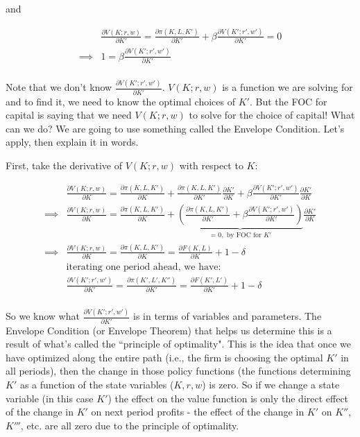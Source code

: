 \documentclass[letterpaper,12pt]{article}
\theoremstyle{definition}
\begin{document}
\begin{spacing}{1.5}
and 

\begin{equation}
\label{eqn:bellman_foc_k}
\begin{split}
&\frac{\partial V(K;r,w)}{\partial K'} = \frac{\partial \pi(K,L,K')}{\partial K'} + \beta \frac{\partial V(K'; r',w')}{\partial K'} = 0 \\
\implies & 1 = \beta \frac{\partial V(K';r',w')}{\partial K'}  \\
\end{split}
\end{equation}

Note that we don't know $\frac{\partial V(K';r',w')}{\partial K'}$.  $V(K;r,w)$ is a function we are solving for and to find it, we need to know the optimal choices of $K'$.  But the FOC for capital is saying that we need $V(K;r,w)$ to solve for the choice of capital!  What can we do?  We are going to use something called the Envelope Condition.  Let's apply, then explain it in words.

First, take the derivative of $V(K;r,w)$ with respect to $K$: 

\begin{equation}
\begin{split}
& \frac{\partial V(K;r,w)}{\partial K} = \frac{\partial \pi(K,L,K')}{\partial K} +  \frac{\partial \pi(K,L,K')}{\partial K'}\frac{\partial K'}{\partial K} + \beta  \frac{\partial V(K'; r',w')}{\partial K'}\frac{\partial K'}{\partial K} \\
\implies &  \frac{\partial V(K;r,w)}{\partial K} = \frac{\partial \pi(K,L,K')}{\partial K} +  \underbrace{\left(\frac{\partial \pi(K,L,K')}{\partial K'} + \beta  \frac{\partial V(K'; r',w')}{\partial K'}\right)}_{=0, \text{ by FOC for $K'$}}\frac{\partial K'}{\partial K} \\
\implies & \frac{\partial V(K;r,w)}{\partial K} = \frac{\partial \pi(K,L,K')}{\partial K} = \frac{\partial F(K,L)}{\partial K} + 1 - \delta \\
& \text{iterating one period ahead, we have:}\\
& \frac{\partial V(K';r',w')}{\partial K'} = \frac{\partial \pi(K',L',K'')}{\partial K'} =  \frac{\partial F(K',L')}{\partial K'} + 1 - \delta  \\
\end{split}
\end{equation}

So we know what $ \frac{\partial V(K';r',w')}{\partial K'}$ is in terms of variables and parameters.  The Envelope Condition (or Envelope Theorem) that helps us determine this is a result of what's called the ``principle of optimality".  This is the idea that once we have optimized along the entire path (i.e., the firm is choosing the optimal $K'$ in all periods), then the change in those policy functions (the functions determining $K'$ as a function of the state variables ($K,r,w$) is zero.  So if we change a state variable (in this case $K'$) the effect on the value function is only the direct effect of the change in $K'$ on next period profits - the effect of the change in $K'$ on $K''$, $K'''$, etc. are all zero due to the principle of optimality.


\end{spacing}
\end{document}
